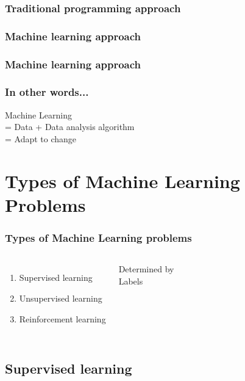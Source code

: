 \documentclass[]{beamer}
\begin{document}
\begin{frame}
\frametitle{Traditional programming approach}
\begin{center}
\end{center}
\end{frame}


\subsubsection{Machine learning approach}

\begin{frame}
\frametitle{Machine learning approach}
\begin{center}
\end{center}
\end{frame}

\begin{frame}
\frametitle{In other words...}
\begin{center}
Machine Learning \\
 \huge = Data + Data analysis algorithm \\
 \Huge = Adapt to change
\end{center}
\end{frame}

\section{Types of Machine Learning Problems}

\begin{frame}
\frametitle{Types of Machine Learning problems}
\begin{columns}
\begin{enumerate}
\item<2-> Supervised learning
\item<3-> Unsupervised learning
\item<4-> Reinforcement learning
\end{enumerate}
\pause
{}
Determined by \\
\Huge Labels
\end{columns}
\end{frame}

\subsection{Supervised learning}
\end{document}
